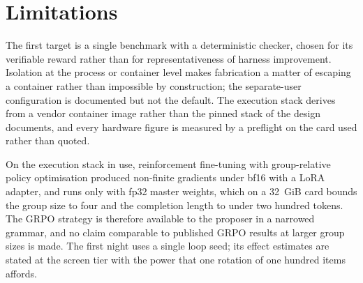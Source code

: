 \section{Limitations}
\label{sec:limitations}

The first target is a single benchmark with a deterministic checker, chosen for its verifiable reward rather than for representativeness of harness improvement. Isolation at the process or container level makes fabrication a matter of escaping a container rather than impossible by construction; the separate-user configuration is documented but not the default. The execution stack derives from a vendor container image rather than the pinned stack of the design documents, and every hardware figure is measured by a preflight on the card used rather than quoted.

On the execution stack in use, reinforcement fine-tuning with group-relative policy optimisation produced non-finite gradients under bf16 with a LoRA adapter, and runs only with fp32 master weights, which on a 32~GiB card bounds the group size to four and the completion length to under two hundred tokens. The GRPO strategy is therefore available to the proposer in a narrowed grammar, and no claim comparable to published GRPO results at larger group sizes is made. The first night uses a single loop seed; its effect estimates are stated at the screen tier with the power that one rotation of one hundred items affords.

